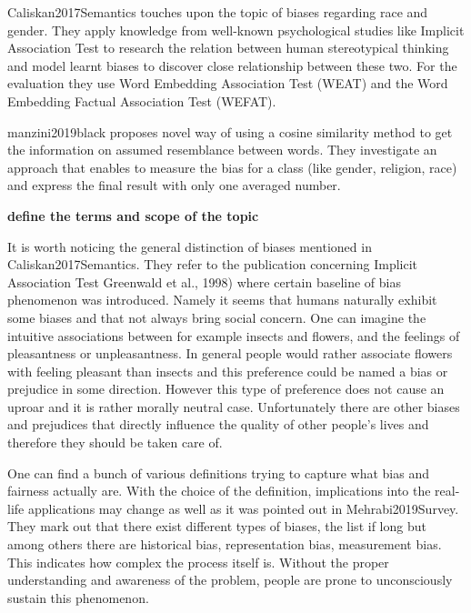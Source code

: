\documentclass[]{book}
\begin{document}
Caliskan2017Semantics touches upon the topic of biases regarding race
and gender. They apply knowledge from well-known psychological studies
like Implicit Association Test to research the relation between human
stereotypical thinking and model learnt biases to discover close
relationship between these two. For the evaluation they use Word
Embedding Association Test (WEAT) and the Word Embedding Factual
Association Test (WEFAT).

manzini2019black proposes novel way of using a cosine similarity method
to get the information on assumed resemblance between words. They
investigate an approach that enables to measure the bias for a class
(like gender, religion, race) and express the final result with only one
averaged number. \newline

\textbf{define the terms and scope of the topic}

It is worth noticing the general distinction of biases mentioned in
Caliskan2017Semantics. They refer to the publication concerning Implicit
Association Test Greenwald et al., 1998) where certain baseline of bias
phenomenon was introduced. Namely it seems that humans naturally exhibit
some biases and that not always bring social concern. One can imagine
the intuitive associations between for example insects and flowers, and
the feelings of pleasantness or unpleasantness. In general people would
rather associate flowers with feeling pleasant than insects and this
preference could be named a bias or prejudice in some direction. However
this type of preference does not cause an uproar and it is rather
morally neutral case. Unfortunately there are other biases and
prejudices that directly influence the quality of other people's lives
and therefore they should be taken care of.

One can find a bunch of various definitions trying to capture what bias
and fairness actually are. With the choice of the definition,
implications into the real-life applications may change as well as it
was pointed out in Mehrabi2019Survey. They mark out that there exist
different types of biases, the list if long but among others there are
historical bias, representation bias, measurement bias. This indicates
how complex the process itself is. Without the proper understanding and
awareness of the problem, people are prone to unconsciously sustain this
phenomenon.
\end{document}
